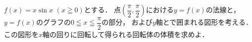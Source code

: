 \documentclass[../../main.tex]{subfiles}
\begin{document}
$f(x)=x\sin x$ $(x \geqq 0)$とする．
点$\displaystyle \left( \dfrac{\pi}{2},\dfrac{\pi}{2} \right)$における$y=f(x)$の法線と，
$y=f(x)$のグラフの$\displaystyle 0 \leqq x \leqq \dfrac{\pi}{2}$の部分，
および$y$軸とで囲まれる図形を考える．
この図形を$x$軸の回りに回転して得られる回転体の体積を求めよ．
\end{document}
